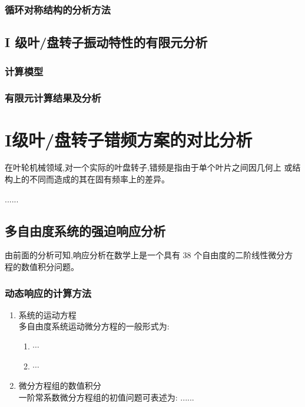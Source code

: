 \documentclass[doctor, openright, oneside]{gdutthesis}
\begin{document}
\subsection{循环对称结构的分析方法}
\section{I 级叶/盘转子振动特性的有限元分析}
\subsection{计算模型}

\subsection{有限元计算结果及分析}

\chapter{I级叶/盘转子错频方案的对比分析}

在叶轮机械领域,对一个实际的叶盘转子,错频是指由于单个叶片之间因几何上
或结构上的不同而造成的其在固有频率上的差异。\par

......\par

\section{多自由度系统的强迫响应分析}

由前面的分析可知,响应分析在数学上是一个具有 38 个自由度的二阶线性微分方
程的数值积分问题。\par

\subsection{动态响应的计算方法}

\begin{enumerate}
\item 系统的运动方程\\
多自由度系统运动微分方程的一般形式为:
\begin{enumerate}
\item $\cdots$
\item $\cdots$
\end{enumerate}
\item 微分方程组的数值积分\\
一阶常系数微分方程组的初值问题可表述为: ......
\end{enumerate}
\end{document}
